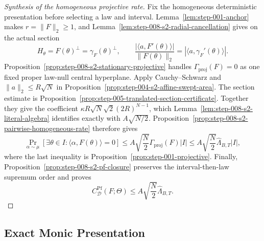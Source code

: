 \begin{proof}[Synthesis of the homogeneous projective rate]
Fix the homogeneous deterministic presentation before selecting a law and
interval.  Lemma~\ref{lem:step-001-anchor} makes
$r=\|F\|_2\geq1$, and Lemma~\ref{lem:step-008-s2-radial-cancellation}
gives on the actual section
\begin{equation}
\label{eq:appendix-display-247}
H_\theta=F(\theta)^\perp=\gamma_F(\theta)^\perp,
\qquad
\frac{|\langle a,F'(\theta)\rangle|}{\|F(\theta)\|_2}
=|\langle a,\gamma_F'(\theta)\rangle|.
\end{equation}
Proposition~\ref{prop:step-008-s2-stationary-projective} handles
$\Gamma_{\mathrm{proj}}(F)=0$ as one fixed proper law-null central
hyperplane. Apply Cauchy--Schwarz and $\|a\|_2\leq R\sqrt N$ in
Proposition~\ref{prop:step-004-s2-affine-swept-area}. The section estimate
is Proposition~\ref{prop:step-005-translated-section-certificate}. Together
they give the coefficient $\kappa R\sqrt N\sqrt2(2R)^{N-1}$, which
Lemma~\ref{lem:step-008-s2-literal-algebra} identifies exactly with
$A\sqrt{N/2}$.  Proposition~\ref{prop:step-008-s2-pairwise-homogeneous-rate}
therefore gives
\begin{equation}
\label{eq:appendix-display-248}
\Pr_{\alpha\sim\mu}
[\exists\theta\in I:\langle\alpha,F(\theta)\rangle=0]
\leq A\sqrt{\frac N2}\Gamma_{\mathrm{proj}}(F)|I|
\leq A\sqrt{\frac N2}\widehat\Lambda_{B,T}|I|,
\end{equation}
where the last inequality is Proposition~\ref{prop:step-001-projective}.
Finally, Proposition~\ref{prop:step-008-s2-pf-closure} preserves the
interval-then-law supremum order and proves
\begin{equation}
\label{eq:appendix-display-249}
C^{\mathrm{Pf}}_{\mathcal D}(F;\Theta)
\leq A\sqrt{\frac N2}\widehat\Lambda_{B,T}.
\end{equation}
\end{proof}

\subsection{Exact Monic Presentation}\label{app:step-009}

